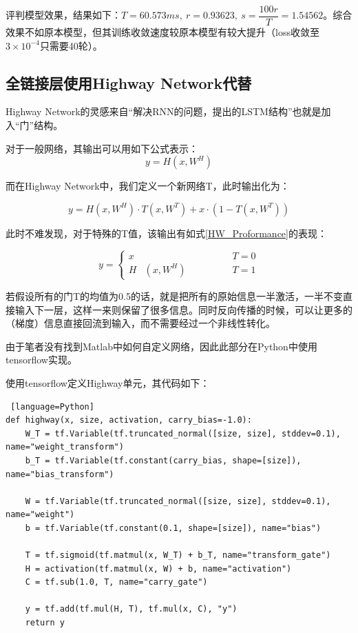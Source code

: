 \documentclass{jnuthesis}
\begin{document}
评判模型效果，结果如下：$  T=60.573ms, \ r=0.93623,\ s=\dfrac{100r}{T}=1.54562$。综合效果不如原本模型，但其训练收敛速度较原本模型有较大提升（loss收敛至$ 3\times 10^{-4} $只需要40轮）。
\subsection{全链接层使用Highway Network代替\cite{srivastava2015highway}}

Highway Network的灵感来自“解决RNN的问题，提出的LSTM结构”也就是加入“门”结构。

对于一般网络，其输出可以用如下公式表示：
\begin{equation}\label{normal}
	y=H(x,W^H)
\end{equation}

而在Highway Network中，我们定义一个新网络T，此时输出化为：

\begin{equation}\label{HeightWay}
	y=H(x,W^H)\cdot T(x,W^T)+x\cdot (1-T(x,W^T))
\end{equation}


此时不难发现，对于特殊的T值，该输出有如式\ref{HW_Proformance}的表现：

\begin{equation}\label{HW_Proformance}
	y=
	\left\{\begin{matrix} 
	x& &T=0\\  
	H&(x,W^H)\qquad\qquad&T=1
\end{matrix}\right. 
\end{equation}

若假设所有的门T的均值为0.5的话，就是把所有的原始信息一半激活，一半不变直接输入下一层，这样一来则保留了很多信息。同时反向传播的时候，可以让更多的（梯度）信息直接回流到输入，而不需要经过一个非线性转化。

由于笔者没有找到Matlab中如何自定义网络，因此此部分在Python中使用tensorflow实现。

使用tensorflow定义Highway单元，其代码如下：

\begin{lstlisting} [language=Python]
def highway(x, size, activation, carry_bias=-1.0):
	W_T = tf.Variable(tf.truncated_normal([size, size], stddev=0.1), name="weight_transform")
	b_T = tf.Variable(tf.constant(carry_bias, shape=[size]), name="bias_transform")

	W = tf.Variable(tf.truncated_normal([size, size], stddev=0.1), name="weight")
	b = tf.Variable(tf.constant(0.1, shape=[size]), name="bias")

	T = tf.sigmoid(tf.matmul(x, W_T) + b_T, name="transform_gate")
	H = activation(tf.matmul(x, W) + b, name="activation")
	C = tf.sub(1.0, T, name="carry_gate")

	y = tf.add(tf.mul(H, T), tf.mul(x, C), "y")
	return y
\end{lstlisting}
\end{document}
